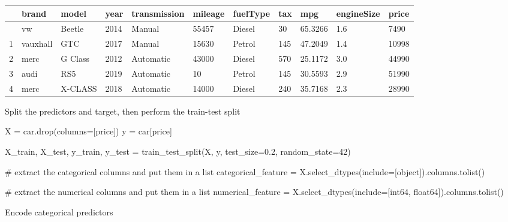 \documentclass[
  letterpaper,
  DIV=11,
  numbers=noendperiod]{scrreprt}
\newenvironment{Shaded}{\begin{snugshade}}{\end{snugshade}}
\newcommand{\CommentTok}[1]{\textcolor[rgb]{0.37,0.37,0.37}{#1}}
\newcommand{\DecValTok}[1]{\textcolor[rgb]{0.68,0.00,0.00}{#1}}
\newcommand{\FloatTok}[1]{\textcolor[rgb]{0.68,0.00,0.00}{#1}}
\newcommand{\NormalTok}[1]{\textcolor[rgb]{0.00,0.23,0.31}{#1}}
\newcommand{\OperatorTok}[1]{\textcolor[rgb]{0.37,0.37,0.37}{#1}}
\newcommand{\StringTok}[1]{\textcolor[rgb]{0.13,0.47,0.30}{#1}}
\begin{document}
\begin{longtable}[]{@{}lllllllllll@{}}
\toprule\noalign{}
& brand & model & year & transmission & mileage & fuelType & tax & mpg &
engineSize & price \\
\midrule\noalign{}
\endhead
\bottomrule\noalign{}
\endlastfoot
0 & vw & Beetle & 2014 & Manual & 55457 & Diesel & 30 & 65.3266 & 1.6 &
7490 \\
1 & vauxhall & GTC & 2017 & Manual & 15630 & Petrol & 145 & 47.2049 &
1.4 & 10998 \\
2 & merc & G Class & 2012 & Automatic & 43000 & Diesel & 570 & 25.1172 &
3.0 & 44990 \\
3 & audi & RS5 & 2019 & Automatic & 10 & Petrol & 145 & 30.5593 & 2.9 &
51990 \\
4 & merc & X-CLASS & 2018 & Automatic & 14000 & Diesel & 240 & 35.7168 &
2.3 & 28990 \\
\end{longtable}

Split the predictors and target, then perform the train-test split

\begin{Shaded}
\begin{Highlighting}[]
\NormalTok{X }\OperatorTok{=}\NormalTok{ car.drop(columns}\OperatorTok{=}\NormalTok{[}\StringTok{\textquotesingle{}price\textquotesingle{}}\NormalTok{])}
\NormalTok{y }\OperatorTok{=}\NormalTok{ car[}\StringTok{\textquotesingle{}price\textquotesingle{}}\NormalTok{]}

\NormalTok{X\_train, X\_test, y\_train, y\_test }\OperatorTok{=}\NormalTok{ train\_test\_split(X, y, test\_size}\OperatorTok{=}\FloatTok{0.2}\NormalTok{, random\_state}\OperatorTok{=}\DecValTok{42}\NormalTok{)}

\CommentTok{\# extract the categorical columns and put them in a list}
\NormalTok{categorical\_feature }\OperatorTok{=}\NormalTok{ X.select\_dtypes(include}\OperatorTok{=}\NormalTok{[}\StringTok{\textquotesingle{}object\textquotesingle{}}\NormalTok{]).columns.tolist()}

\CommentTok{\# extract the numerical columns and put them in a list}
\NormalTok{numerical\_feature }\OperatorTok{=}\NormalTok{ X.select\_dtypes(include}\OperatorTok{=}\NormalTok{[}\StringTok{\textquotesingle{}int64\textquotesingle{}}\NormalTok{, }\StringTok{\textquotesingle{}float64\textquotesingle{}}\NormalTok{]).columns.tolist()}
\end{Highlighting}
\end{Shaded}

Encode categorical predictors
\end{document}
